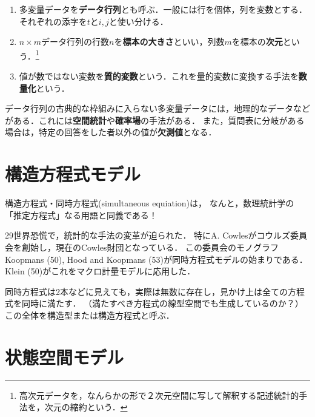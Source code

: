 \documentclass[uplatex,dvipdfmx]{jsreport}
\begin{document}
\begin{definition}\mbox{}
    \begin{enumerate}
        \item 多変量データを\textbf{データ行列}とも呼ぶ．一般には行を個体，列を変数とする．それぞれの添字を$t$と$i,j$と使い分ける．
        \item $n\times m$データ行列の行数$n$を\textbf{標本の大きさ}といい，列数$m$を標本の\textbf{次元}という．\footnote{高次元データを，なんらかの形で２次元空間に写して解釈する記述統計的手法を，次元の縮約という．}
        \item 値が数ではない変数を\textbf{質的変数}という．これを量的変数に変換する手法を\textbf{数量化}という．
    \end{enumerate}
\end{definition}
\begin{remark}
    データ行列の古典的な枠組みに入らない多変量データには，地理的なデータなどがある．これには\textbf{空間統計}や\textbf{確率場}の手法がある．
    また，質問表に分岐がある場合は，特定の回答をした者以外の値が\textbf{欠測値}となる．
\end{remark}

\section{構造方程式モデル}

\begin{tcolorbox}[colframe=ForestGreen, colback=ForestGreen!10!white,breakable,colbacktitle=ForestGreen!40!white,coltitle=black,fonttitle=\bfseries\sffamily,
title=]
    構造方程式・同時方程式(simultaneous equiation)は，
    なんと，数理統計学の「推定方程式」なる用語と同義である！
\end{tcolorbox}

\begin{history}[同時方程式モデル]
    29世界恐慌で，統計的な手法の変革が迫られた．
    特にA. Cowlesがコウルズ委員会を創始し，現在のCowles財団となっている．
    この委員会のモノグラフKoopmans (50), Hood and Koopmans (53)が同時方程式モデルの始まりである．
    Klein (50)がこれをマクロ計量モデルに応用した．
\end{history}

同時方程式は2本などに見えても，実際は無数に存在し，見かけ上は全ての方程式を同時に満たす．
（満たすべき方程式の線型空間でも生成しているのか？）
この全体を構造型または構造方程式と呼ぶ．

\section{状態空間モデル}
\end{document}
